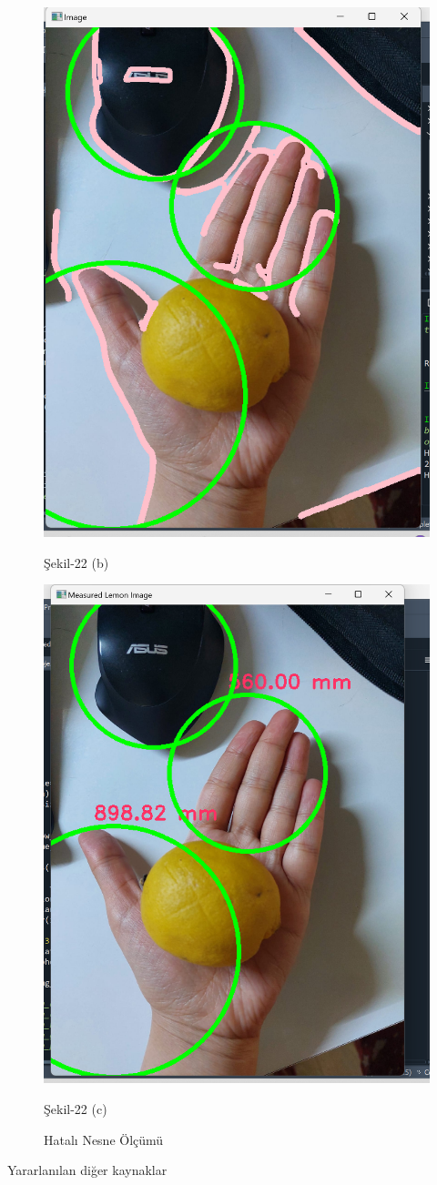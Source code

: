 \documentclass[11pt,a4paper]{report}
\begin{document}
\begin{figure}[!h]
\begin{minipage}{0.45\textwidth}
			\includegraphics[width=\linewidth]{hatalı-olcum-1}
			\label{boyutbulma2}
			\caption*{Şekil-22 (b)}
		\end{minipage}
		
		\vspace{1cm} %
		
		\begin{minipage}{\textwidth} %
			\centering
			\includegraphics[width=0.5\linewidth]{hatalı-olcum-2}
			\caption*{Şekil-22 (c)}
			\label{boyutbulma3}
		\end{minipage}
		
		\caption{Hatalı Nesne Ölçümü} %
		\label{el-nesne-boyutlar}
	\end{figure}
	
	
	Yararlanılan diğer kaynaklar\cite{youtube}\cite{stackoverflow}
	
	
\end{document}
